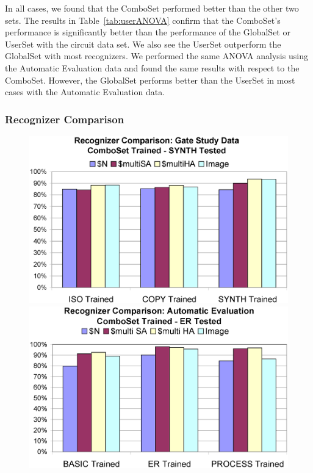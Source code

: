 \documentclass[final,5p,twocolumn]{elsarticle}
\begin{document}
In all cases, we found that the ComboSet performed better than the other two sets.  The results in 
Table~\ref{tab:userANOVA} confirm that the ComboSet's performance is significantly better than the 
performance of the GlobalSet or UserSet with the circuit data set.  We also see the UserSet 
outperform the GlobalSet with most recognizers.  We performed the same ANOVA analysis using the 
Automatic Evaluation data and found the same results with respect to the ComboSet.  
However, the GlobalSet performs better than the UserSet in most cases with the Automatic 
Evaluation data.

\subsubsection{Recognizer Comparison}
\label{recExperiment}
\begin{figure}
\begin{center}
\includegraphics[width=\hsize]{RecComparisonGate.eps}
\includegraphics[width=\hsize]{RecComparisonAutoER.eps}

\end{center}
\end{figure}
\end{document}
